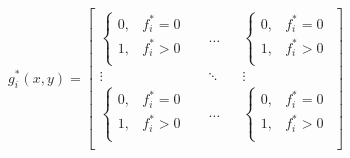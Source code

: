 \documentclass[../main.tex]{subfiles}%
\begin{document}
%
    \Xequation%
    \def\tmp{%
        \left\{%
        \begin{array}{ll}%
            0, & f_{i}^{*} = 0 \\%
            1, & f_{i}^{*} > 0 \\%
        \end{array}%
        \right.%
    }%
    \begin{equation}%
        g_{i}^{*}(x,y) =%
        \begin{bmatrix}%
            \tmp && \dots && \tmp \\%
            \vdots && \ddots && \vdots \\%
            \tmp && \dots && \tmp \\%
        \end{bmatrix}%
        \label{eq:mosaic-stitch-shifted-tally}%
    \end{equation}%
\end{document}
